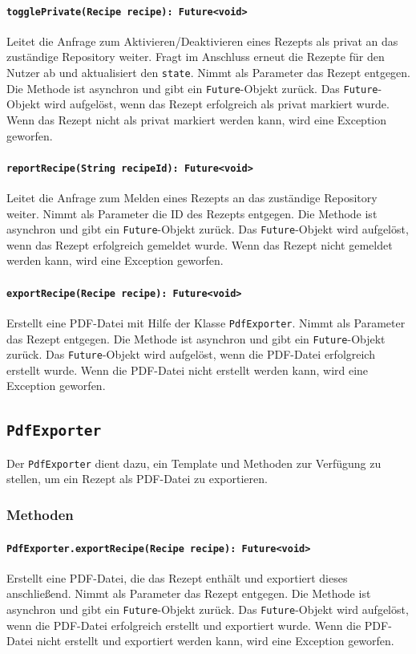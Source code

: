 \documentclass{entwurfsheft}
\begin{document}
\begin{sloppypar}
\paragraph{\texttt{togglePrivate(Recipe recipe): Future<void>}}
Leitet die Anfrage zum Aktivieren/Deak\-ti\-vieren eines Rezepts als privat an das zuständige Repository weiter. Fragt im Anschluss erneut die Rezepte für den Nutzer ab und aktualisiert den \texttt{state}. Nimmt als Parameter das Rezept entgegen. Die Methode ist asynchron und gibt ein \texttt{Future}-Objekt zurück. Das \texttt{Future}-Objekt wird aufgelöst, wenn das Rezept erfolgreich als privat markiert wurde. Wenn das Rezept nicht als privat markiert werden kann, wird eine Exception geworfen.
\paragraph{\texttt{reportRecipe(String recipeId): Future<void>}}
Leitet die Anfrage zum Melden eines Rezepts an das zuständige Repository weiter. Nimmt als Parameter die ID des Rezepts entgegen. Die Methode ist asynchron und gibt ein \texttt{Future}-Objekt zurück. Das \texttt{Future}-Objekt wird aufgelöst, wenn das Rezept erfolgreich gemeldet wurde. Wenn das Rezept nicht gemeldet werden kann, wird eine Exception geworfen.
\paragraph{\texttt{exportRecipe(Recipe recipe): Future<void>}}
Erstellt eine PDF-Datei mit Hilfe der Klasse \texttt{PdfExporter}. Nimmt als Parameter das Rezept entgegen. Die Methode ist asynchron und gibt ein \texttt{Future}-Objekt zurück. Das \texttt{Future}-Objekt wird aufgelöst, wenn die PDF-Datei erfolgreich erstellt wurde. Wenn die PDF-Datei nicht erstellt werden kann, wird eine Exception geworfen.

\newpage
\subsection{\texttt{PdfExporter}}
\label{sec:pdfExporter}
Der \texttt{PdfExporter} dient dazu, ein Template und Methoden zur Verfügung zu stellen, um ein Rezept als PDF-Datei zu exportieren.
\subsubsection*{Methoden}
\paragraph{\texttt{PdfExporter.exportRecipe(Recipe recipe): Future<void>}}
Erstellt eine PDF-Datei, die das Rezept enthält und exportiert dieses anschließend. Nimmt als Parameter das Rezept entgegen. Die Methode ist asynchron und gibt ein \texttt{Future}-Objekt zurück. Das \texttt{Future}-Objekt wird aufgelöst, wenn die PDF-Datei erfolgreich erstellt und exportiert wurde. Wenn die PDF-Datei nicht erstellt und exportiert werden kann, wird eine Exception geworfen.
\newpage

\end{sloppypar}
\end{document}

